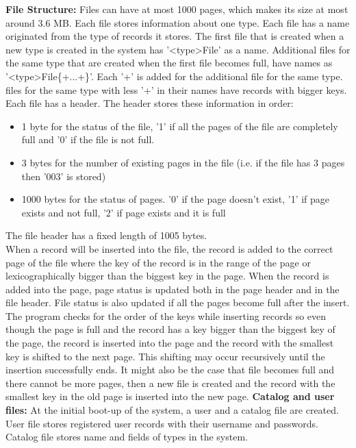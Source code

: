 \documentclass{article}
\begin{document}
\textbf{File Structure:} Files can have at most 1000 pages, which makes its size at most around 3.6 MB. Each file stores information about one type. Each file has a name originated from the type of records it stores. The first file that is created when a new type is created in the system has '\textless type\textgreater File' as a name. Additional files for the same type that are created when the first file becomes full, have names as '\textless type\textgreater File\{+...+\}'. Each '+' is added for the additional file for the same type. files for the same type with less '+' in their names have records with bigger keys. Each file has a header. The header stores these information in order:
\begin{itemize}
    \item 1 byte for the status of the file, '1' if all the pages of the file are completely full and '0' if the file is not full.
    \item 3 bytes for the number of existing pages in the file (i.e. if the file has 3 pages then '003' is stored)
    \item 1000 bytes for the status of pages. '0' if the page doesn't exist, '1' if page exists and not full, '2' if page exists and it is full
\end{itemize}
The file header has a fixed length of 1005 bytes. \\
When a record will be inserted into the file, the record is added to the correct page of the file where the key of the record is in the range of the page or lexicographically bigger than the biggest key in the page. When the record is added into the page, page status is updated both in the page header and in the file header. File status is also updated if all the pages become full after the insert. The program checks for the order of the keys while inserting records so even though the page is full and the record has a key bigger than the biggest key of the page, the record is inserted into the page and the record with the smallest key is shifted to the next page. This shifting may occur recursively until the insertion successfully ends. It might also be the case that file becomes full and there cannot be more pages, then a new file is created and the record with the smallest key in the old page is inserted into the new page.
\newline \newline
\textbf{Catalog and user files:} At the initial boot-up of the system, a user and a catalog file are created.
User file stores registered user records with their username and passwords. Catalog file stores name and fields of types in the system.\\
\end{document}
